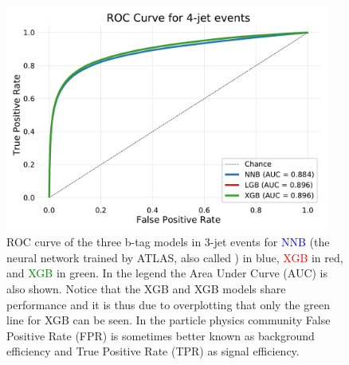 \begin{figure}
  \includegraphics[width=0.95\textwidth, trim=10 10 10 40, clip]{figures/quarks/ROC_4_jet-down_sample=1.00-ML_vars=vertex-selection=b-ejet_min=4-n_iter_RS_lgb=99-n_iter_RS_xgb=9-cdot_cut=0.90-version=19.pdf}
  \caption[ROC curve for b-tag in 4-jet events]
          {ROC curve of the three b-tag models in 3-jet events for \textcolor{blue}{NNB} (the neural network trained by ATLAS, also called ) in blue, \textcolor{red}{XGB} in red, and \textcolor{green}{XGB} in green. In the legend the Area Under Curve (AUC) is also shown. Notice that the XGB and XGB models share performance and it is thus due to overplotting that only the green line for XGB can be seen. In the particle physics community False Positive Rate (FPR) is sometimes better known as background efficiency and True Positive Rate (TPR) as signal efficiency.  
          } 
  \label{fig:q:roc_btag_4j}
\end{figure}





